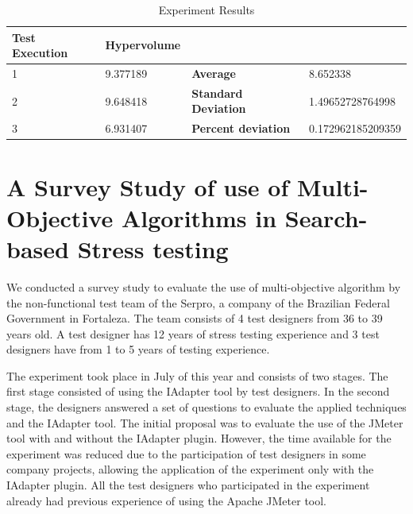 \documentclass[espaco=umemeio,chapter=TITLE,twoside,openright]{abnt}
\begin{document}
\begin{table}[]
\centering
\caption{Experiment Results}
\label{my-label}
\begin{tabular}{|l|l|ll}
\cline{1-2}
\cellcolor[HTML]{EFEFEF}\textbf{Test Execution} & \cellcolor[HTML]{EFEFEF}\textbf{Hypervolume} &                                                     &                                        \\ \hline
1                                               & 9.377189                                     & \multicolumn{1}{l|}{\textbf{Average}}               & \multicolumn{1}{l|}{8.652338}          \\ \hline
2                                               & 9.648418                                     & \multicolumn{1}{l|}{\textbf{Standard Deviation}}   & \multicolumn{1}{l|}{1.49652728764998}  \\ \hline
3                                               & 6.931407                                     & \multicolumn{1}{l|}{\textbf{Percent deviation}} & \multicolumn{1}{l|}{0.172962185209359} \\ \hline
\end{tabular}
\end{table}

\section{A Survey Study of use of Multi-Objective Algorithms in Search-based Stress testing}

We conducted a survey study to evaluate the use of multi-objective algorithm by the non-functional test team of the Serpro, a company of the Brazilian Federal Government in Fortaleza. The team consists of 4 test designers from 36 to 39 years old. A test designer has 12 years of stress testing experience and 3 test designers have from 1 to 5 years of testing experience.

The experiment took place in July of this year and consists of two stages. The first stage consisted of using the IAdapter tool by test designers. In the second stage, the designers answered a set of questions to evaluate the applied techniques and the IAdapter tool. The initial proposal was to evaluate the use of the JMeter tool with and without the IAdapter plugin. However, the time available for the experiment was reduced due to the participation of test designers in some company projects, allowing the application of the experiment only with the IAdapter plugin. All the test designers who participated in the experiment already had previous experience of using the Apache JMeter tool.
\end{document}
